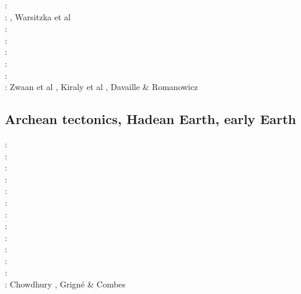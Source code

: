 {\twothousandtwelve: \cite{grmd12}\cite{iadc12}\\
\twothousandthirteen: \cite{luws13}\cite{vadv13}\cite{guhf13}\cite{mibg13}\cite{mesc13}\cite{dusc13}\cite{kern13}, Warsitzka et al \cite{wakk13}\\
\twothousandfifteen: \cite{casw15}\cite{rods15}\cite{kiff15}\cite{chsd15}\\
\twothousandsixteen: \cite{scbb16}\cite{chss16}\\
\twothousandseventeen: \cite{casw17}\\
\twothousandeighteen: \cite{pirf18}\\
\twothousandnineteen: \cite{mocb19}\cite{sccs19}\cite{muwm19}\cite{fegb19}\\
\twothousandtwenty: Zwaan et al \cite{zwsr20}, Kiraly et al \cite{kiph20},
                    Davaille \& Romanowicz \cite{daro20}
}

\subsection{Archean tectonics, Hadean Earth, early Earth}

\begin{scriptsize}
\nineteeneightyfour: \cite{boas84}\\
\nineteenninetyfour: \cite{vlvv94}\\
\nineteenninetysix: \cite{kafo96}\\
\twothousand: \cite{devv00b}\\
\twothousandfour: \cite{vavv04b}\cite{vavv04}\\
\twothousandsix: \cite{reho06}\\
\twothousandeight: \cite{vava08}\\
\twothousandten: \cite{grpy10}\\
\twothousandfifteen: \cite{maha15}\\
\twothousandsixteen: \cite{onlw16}\cite{fige16}\\
\twothousandseventeen: \cite{onmz17}\\
\twothousandnineteen: \cite{canc19}\cite{gery19}\\
\twothousandtwenty: Chowdhury \etal{} \cite{chcg20}, Grign\'e \& Combes \cite{grco20}
\end{scriptsize}

